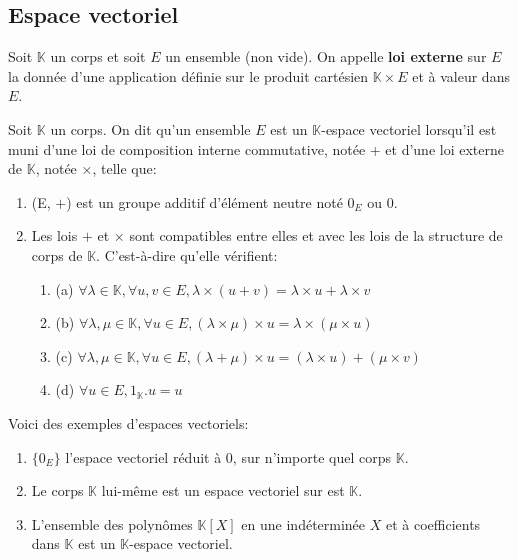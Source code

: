 \subsection{Espace vectoriel}
\begin{madefinition}
	Soit $\mathbb{K}$ un corps et soit $E$ un ensemble (non vide). On appelle \textbf{loi externe} sur $E$ la donnée d'une application définie sur le produit cartésien $\mathbb{K} \times E$ et à valeur dans $E$.
\end{madefinition}
\begin{madefinition}
	Soit $\mathbb{K}$ un corps. On dit qu’un ensemble $E$ est un $\mathbb{K}$-espace vectoriel
	lorsqu’il est muni d’une loi de composition interne commutative, notée + et d’une
	loi externe de $\mathbb{K}$, notée $\times$, telle que:
	\begin{enumerate}
		\item (E, $+$) est un groupe additif d'élément neutre noté $0_E$ ou $0$.
		\item Les lois $+$ et $\times$ sont compatibles entre elles et avec les lois de la structure de corps de $\mathbb{K}$. C'est-à-dire qu'elle vérifient:
		\begin{enumerate}
			\item (a) $\forall \lambda \in \mathbb{K}, \forall u,v \in E, \lambda \times (u+v) = \lambda \times u + \lambda \times v$
			\item (b) $\forall \lambda , \mu \in \mathbb{K}, \forall u \in E, (\lambda \times \mu)\times u 
			= \lambda \times(\mu \times u) $
			\item (c) $\forall \lambda, \mu \in \mathbb{K}, \forall u \in E, (\lambda + \mu)\times u = (\lambda \times u) + (\mu \times v)$
			\item (d) $\forall u \in E, 1_{\mathbb{K}}.u=u$
		\end{enumerate}
	\end{enumerate}	
\end{madefinition}
\begin{monexemple}
	Voici des exemples d'espaces vectoriels:
	\begin{enumerate}
		\item $\{0_E\}$ l'espace vectoriel réduit à $0$, sur n’importe quel corps $\mathbb{K}$. 
		\item Le corps $\mathbb{K}$ lui-même est un espace vectoriel sur est $\mathbb{K}$.
		\item  L'ensemble des polynômes $\mathbb{K}[X]$ en une indéterminée $X$ et à coefficients dans $\mathbb{K}$ est un $\mathbb{K}$-espace vectoriel.
	\end{enumerate}
\end{monexemple}
